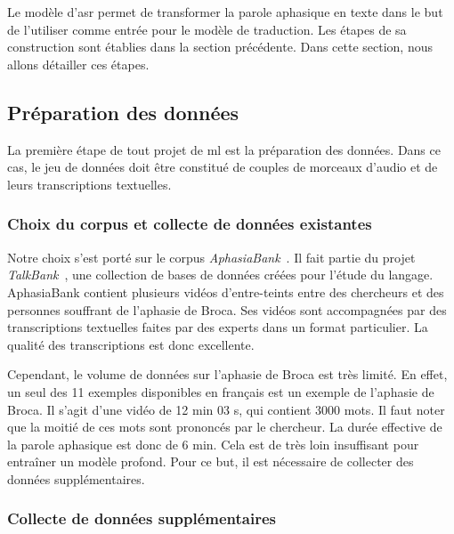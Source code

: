 \section{}

Le modèle d'\gls{asr} permet de transformer la parole aphasique en texte
dans le but de l'utiliser comme entrée pour le modèle de traduction.
Les étapes de sa construction sont établies dans la section précédente.
Dans cette section, nous allons détailler ces étapes.

\subsection{Préparation des données}

La première étape de tout projet de \gls{ml} est la préparation des données.
Dans ce cas, le jeu de données doit être constitué de couples de morceaux d'audio et de leurs transcriptions textuelles.

\subsubsection{Choix du corpus et collecte de données existantes}

Notre choix s'est porté sur le corpus \textit{AphasiaBank}~\cite{MacWhinney_Fromm_Forbes_Holland_2011}.
Il fait partie du projet \textit{TalkBank}~\cite{macwhinney2007talkbank},
une collection de bases de données créées pour l'étude du langage.
AphasiaBank contient plusieurs vidéos d'entre-teints entre des chercheurs 
et des personnes souffrant de l'aphasie de Broca.
Ses vidéos sont accompagnées par des transcriptions textuelles faites par des experts dans un format particulier.
La qualité des transcriptions est donc excellente.

Cependant, le volume de données sur l'aphasie de Broca est très limité.
En effet, un seul des 11 exemples disponibles en français est un exemple de l'aphasie de Broca.
Il s'agit d'une vidéo de 12 min 03 s, qui contient 3000 mots.
Il faut noter que la moitié de ces mots sont prononcés par le chercheur.
La durée effective de la parole aphasique est donc de 6 min.
Cela est de très loin insuffisant pour entraîner un modèle profond.
Pour ce but, il est nécessaire de collecter des données supplémentaires. 

\subsubsection{Collecte de données supplémentaires}

